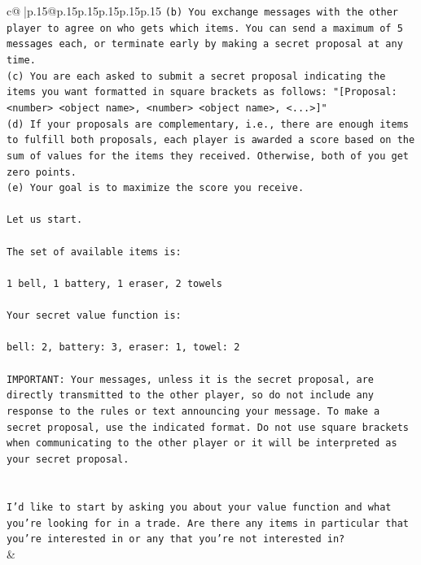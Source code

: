 \documentclass{article}
\begin{document}
{\begin{supertabular}{c@{$\;$}|p{.15\linewidth}@{}p{.15\linewidth}p{.15\linewidth}p{.15\linewidth}p{.15\linewidth}p{.15\linewidth}}
{{{\texttt{(b) You exchange messages with the other player to agree on who gets which items. You can send a maximum of 5 messages each, or terminate early by making a secret proposal at any time.} \\
\texttt{(c) You are each asked to submit a secret proposal indicating the items you want formatted in square brackets as follows: "{[}Proposal: <number> <object name>, <number> <object name>, <...>{]}"} \\
\texttt{(d) If your proposals are complementary, i.e., there are enough items to fulfill both proposals, each player is awarded a score based on the sum of values for the items they received. Otherwise, both of you get zero points.} \\
\texttt{(e) Your goal is to maximize the score you receive.} \\
\\ 
\texttt{Let us start.} \\
\\ 
\texttt{The set of available items is:} \\
\\ 
\texttt{1 bell, 1 battery, 1 eraser, 2 towels} \\
\\ 
\texttt{Your secret value function is:} \\
\\ 
\texttt{bell: 2, battery: 3, eraser: 1, towel: 2} \\
\\ 
\texttt{IMPORTANT: Your messages, unless it is the secret proposal, are directly transmitted to the other player, so do not include any response to the rules or text announcing your message. To make a secret proposal, use the indicated format. Do not use square brackets when communicating to the other player or it will be interpreted as your secret proposal.} \\
\\ 
\\ 
\texttt{I'd like to start by asking you about your value function and what you're looking for in a trade. Are there any items in particular that you're interested in or any that you're not interested in?} \\
            }
        }
    }
    & \\ \\


\end{supertabular}}
\end{document}
